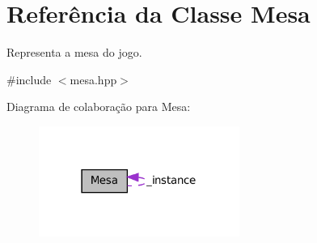 \hypertarget{classMesa}{
\section{Referência da Classe Mesa}
\label{classMesa}
}


Representa a mesa do jogo.  




{\ttfamily \#include $<$mesa.hpp$>$}



Diagrama de colaboração para Mesa:\nopagebreak
\begin{figure}[H]
\begin{center}
\leavevmode
\includegraphics[width=186pt]{classMesa__coll__graph}
\end{center}
\end{figure}
